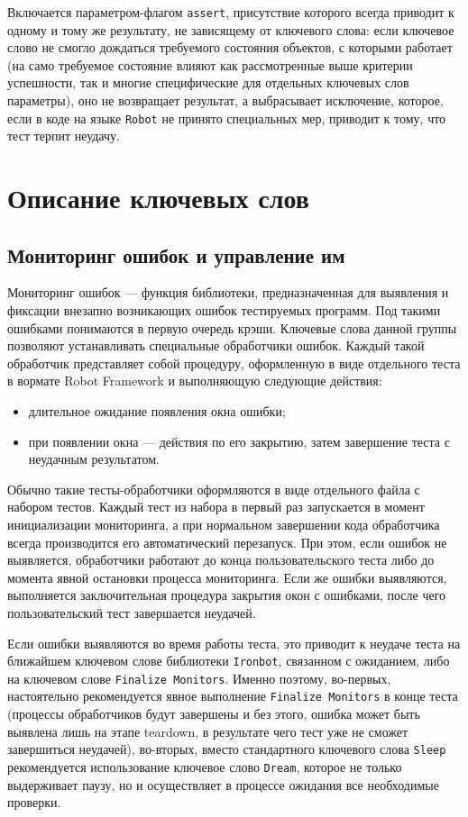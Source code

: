 \documentclass[11pt]{book} %
\begin{document}
Включается параметром-флагом \verb|assert|, присутствие которого всегда приводит к одному и тому же результату, не зависящему от ключевого слова: если ключевое слово не смогло дождаться требуемого состояния объектов, с которыми работает (на само требуемое состояние влияют как рассмотренные выше критерии успешности, так и многие специфические для отдельных ключевых слов параметры), оно не возвращает результат, а выбрасывает исключение, которое, если в коде на языке \verb|Robot| не принято специальных мер, приводит к тому, что тест терпит неудачу.

\chapter{Описание ключевых слов}


\section{Мониторинг ошибок и управление им}

Мониторинг ошибок --- функция библиотеки, предназначенная для выявления и фиксации внезапно возникающих ошибок тестируемых программ. Под такими ошибками понимаются в первую очередь крэши. Ключевые слова данной группы позволяют устанавливать специальные обработчики ошибок. Каждый такой обработчик представляет собой процедуру, оформленную в виде отдельного теста в вормате Robot Framework и выполняющую следующие действия:

\begin{itemize}
\item длительное ожидание появления окна ошибки;
\item при появлении окна --- действия по его закрытию, затем завершение теста с неудачным результатом. 
\end{itemize}

Обычно такие тесты-обработчики оформляются в виде отдельного файла с набором тестов. Каждый тест из набора в первый раз запускается в момент инициализации мониторинга, а при нормальном завершении кода обработчика всегда производится его автоматический перезапуск. При этом, если ошибок не выявляется, обработчики работают до конца пользовательского теста либо до момента явной остановки процесса мониторинга. Если же ошибки выявляются, выполняется заключительная процедура закрытия окон с ошибками, после чего пользовательский тест завершается неудачей.

Если ошибки выявляются во время работы теста, это приводит к неудаче теста на ближайшем ключевом слове библиотеки \verb|Ironbot|, связанном с ожиданием, либо на ключевом слове \verb|Finalize Monitors|. Именно поэтому, во-первых, настоятельно рекомендуется явное выполнение \verb|Finalize Monitors| в конце теста (процессы обработчиков будут завершены и без этого, ошибка может быть выявлена лишь на этапе teardown, в результате чего тест уже не сможет завершиться неудачей), во-вторых, вместо стандартного ключевого слова \verb|Sleep| рекомендуется использование ключевое слово \verb|Dream|, которое не только выдерживает паузу, но и осуществляет в процессе ожидания все необходимые проверки. 
\end{document}
